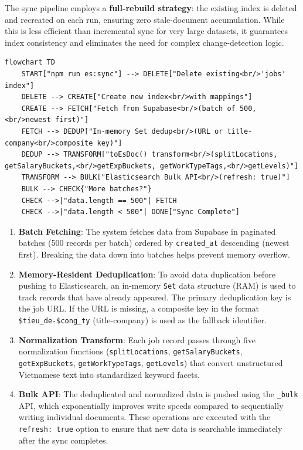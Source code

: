 The sync pipeline employs a \textbf{full-rebuild strategy}: the existing index is deleted and recreated on each run, ensuring zero stale-document accumulation. While this is less efficient than incremental sync for very large datasets, it guarantees index consistency and eliminates the need for complex change-detection logic.

\begin{verbatim}
flowchart TD
    START["npm run es:sync"] --> DELETE["Delete existing<br/>'jobs' index"]
    DELETE --> CREATE["Create new index<br/>with mappings"]
    CREATE --> FETCH["Fetch from Supabase<br/>(batch of 500,<br/>newest first)"]
    FETCH --> DEDUP["In-memory Set dedup<br/>(URL or title-company<br/>composite key)"]
    DEDUP --> TRANSFORM["toEsDoc() transform<br/>(splitLocations, getSalaryBuckets,<br/>getExpBuckets, getWorkTypeTags,<br/>getLevels)"]
    TRANSFORM --> BULK["Elasticsearch Bulk API<br/>(refresh: true)"]
    BULK --> CHECK{"More batches?"}
    CHECK -->|"data.length == 500"| FETCH
    CHECK -->|"data.length < 500"| DONE["Sync Complete"]
\end{verbatim}

\begin{enumerate}
\item \textbf{Batch Fetching}: The system fetches data from Supabase in paginated batches (500 records per batch) ordered by \texttt{created\_at} descending (newest first). Breaking the data down into batches helps prevent memory overflow.
\item \textbf{Memory-Resident Deduplication}: To avoid data duplication before pushing to Elasticsearch, an in-memory \texttt{Set} data structure (RAM) is used to track records that have already appeared. The primary deduplication key is the job URL. If the URL is missing, a composite key in the format \texttt{\${tieu\_de}-\${cong\_ty}} (title-company) is used as the fallback identifier.
\item \textbf{Normalization Transform}: Each job record passes through five normalization functions (\texttt{splitLocations}, \texttt{getSalaryBuckets}, \texttt{getExpBuckets}, \texttt{getWorkTypeTags}, \texttt{getLevels}) that convert unstructured Vietnamese text into standardized keyword facets.
\item \textbf{Bulk API}: The deduplicated and normalized data is pushed using the \texttt{\_bulk} API, which exponentially improves write speeds compared to sequentially writing individual documents. These operations are executed with the \texttt{refresh: true} option to ensure that new data is searchable immediately after the sync completes.
\end{enumerate}

